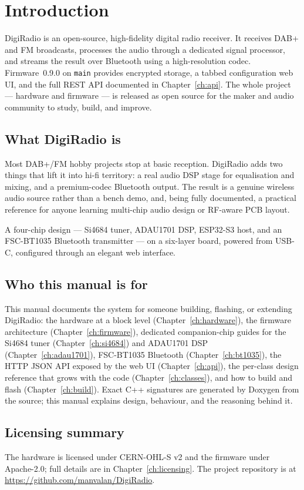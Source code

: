 \chapter{Introduction}
\label{ch:introduction}

DigiRadio is an open-source, high-fidelity digital radio receiver. It
receives DAB+ and FM broadcasts, processes the audio through a dedicated
signal processor, and streams the result over Bluetooth using a
high-resolution codec. Firmware~0.9.0 on \texttt{main} provides encrypted
storage, a tabbed configuration web UI, and the full REST API documented
in Chapter~\ref{ch:api}. The whole project --- hardware and firmware --- is
released as open source for the maker and audio community to study,
build, and improve.

\section{What DigiRadio is}

Most DAB+/FM hobby projects stop at basic reception. DigiRadio adds two
things that lift it into hi-fi territory: a real audio DSP stage for
equalisation and mixing, and a premium-codec Bluetooth output. The result
is a genuine wireless audio source rather than a bench demo, and, being
fully documented, a practical reference for anyone learning multi-chip
audio design or RF-aware PCB layout.

\begin{drkey}[At a glance]
A four-chip design --- Si4684 tuner, ADAU1701 DSP, ESP32-S3 host, and an
FSC-BT1035 Bluetooth transmitter --- on a six-layer board, powered from
USB-C, configured through an elegant web interface.
\end{drkey}

\section{Who this manual is for}

This manual documents the system for someone building, flashing, or
extending DigiRadio: the hardware at a block level
(Chapter~\ref{ch:hardware}), the firmware architecture
(Chapter~\ref{ch:firmware}), dedicated companion-chip guides for the
Si4684 tuner (Chapter~\ref{ch:si4684}) and ADAU1701 DSP
(Chapter~\ref{ch:adau1701}), FSC-BT1035 Bluetooth
(Chapter~\ref{ch:bt1035}), the HTTP JSON API exposed by the web UI
(Chapter~\ref{ch:api}), the per-class design reference that grows with
the code (Chapter~\ref{ch:classes}), and how to build and flash
(Chapter~\ref{ch:build}). Exact C++ signatures are generated by Doxygen
from the source; this manual explains design, behaviour, and the
reasoning behind it.

\section{Licensing summary}

The hardware is licensed under CERN-OHL-S v2 and the firmware under
Apache-2.0; full details are in Chapter~\ref{ch:licensing}. The project
repository is at \url{https://github.com/manvalan/DigiRadio}.
